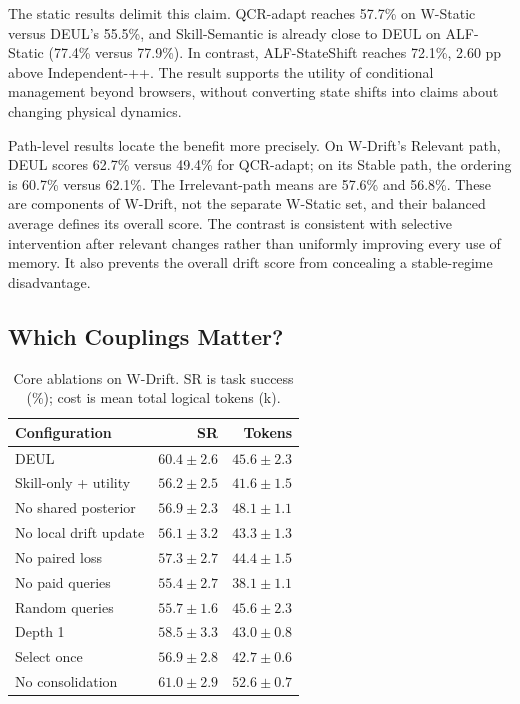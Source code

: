 \documentclass[sigconf,anonymous,review]{acmart}
\theoremstyle{zhplain}
\begin{document}
The static results delimit this claim. QCR-adapt reaches 57.7\% on W-Static versus DEUL's 55.5\%, and Skill-Semantic is already close to DEUL on ALF-Static (77.4\% versus 77.9\%). In contrast, ALF-StateShift reaches 72.1\%, 2.60 pp above Independent-++. The result supports the utility of conditional management beyond browsers, without converting state shifts into claims about changing physical dynamics.

Path-level results locate the benefit more precisely. On W-Drift's Relevant path, DEUL scores 62.7\% versus 49.4\% for QCR-adapt; on its Stable path, the ordering is 60.7\% versus 62.1\%. The Irrelevant-path means are 57.6\% and 56.8\%. These are components of W-Drift, not the separate W-Static set, and their balanced average defines its overall score. The contrast is consistent with selective intervention after relevant changes rather than uniformly improving every use of memory. It also prevents the overall drift score from concealing a stable-regime disadvantage.

\subsection{Which Couplings Matter?}

\begin{table}[t]
\centering
\caption{Core ablations on W-Drift. SR is task success (\%); cost is mean total logical tokens (k).}
\label{tab:ablation}
\small
\begin{tabular}{@{}lrr@{}}
\toprule
Configuration & SR & Tokens \\
\midrule
DEUL & \(60.4\!\pm\!2.6\) & \(45.6\!\pm\!2.3\) \\
Skill-only + utility & \(56.2\!\pm\!2.5\) & \(41.6\!\pm\!1.5\) \\
No shared posterior & \(56.9\!\pm\!2.3\) & \(48.1\!\pm\!1.1\) \\
No local drift update & \(56.1\!\pm\!3.2\) & \(43.3\!\pm\!1.3\) \\
No paired loss & \(57.3\!\pm\!2.7\) & \(44.4\!\pm\!1.5\) \\
No paid queries & \(55.4\!\pm\!2.7\) & \(38.1\!\pm\!1.1\) \\
Random queries & \(55.7\!\pm\!1.6\) & \(45.6\!\pm\!2.3\) \\
Depth 1 & \(58.5\!\pm\!3.3\) & \(43.0\!\pm\!0.8\) \\
Select once & \(56.9\!\pm\!2.8\) & \(42.7\!\pm\!0.6\) \\
No consolidation & \(61.0\!\pm\!2.9\) & \(52.6\!\pm\!0.7\) \\
\bottomrule
\end{tabular}
\end{table}
\end{document}
